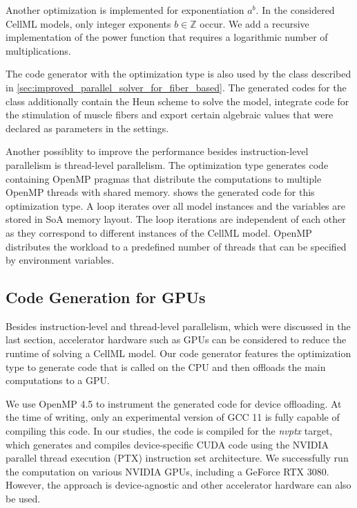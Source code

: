 Another optimization is implemented for exponentiation $a^b$. In the considered CellML models, only integer exponents $b\in \mathbb{Z}$ occur. We add a recursive implementation of the power function that requires a logarithmic number of multiplications. 

The code generator with the  optimization type is also used by the  class described in \cref{sec:improved_parallel_solver_for_fiber_based}. The generated codes for the  class additionally contain the Heun scheme to solve the model, integrate code for the stimulation of muscle fibers and  export certain algebraic values that were declared as parameters in the settings.

Another possiblity to improve the performance besides instruction-level parallelism is thread-level parallelism. The  optimization type generates code containing OpenMP pragmas that distribute the computations to multiple OpenMP threads with shared memory.  shows the generated code for this optimization type. A loop iterates over all model instances and the variables are stored in SoA memory layout. The loop iterations are independent of each other as they correspond to different instances of the CellML model. OpenMP distributes the workload to a predefined number of threads that can be specified by environment variables.

\subsection{Code Generation for GPUs}

Besides instruction-level and thread-level parallelism, which were discussed in the last section, accelerator hardware such as GPUs can be considered to reduce the runtime of solving a CellML model.
Our code generator features the  optimization type to generate code that is called on the CPU and then offloads the main computations to a GPU.

We use OpenMP 4.5 to instrument the generated code for device offloading. At the time of writing, only an experimental version of GCC 11 is fully capable of compiling this code. In our studies, the code is compiled for the \emph{nvptx} target, which generates and compiles device-specific CUDA code using the NVIDIA parallel thread execution (PTX) instruction set architecture. We successfully run the computation on various NVIDIA GPUs, including a GeForce RTX 3080. However, the approach is device-agnostic and other accelerator hardware can also be used.

